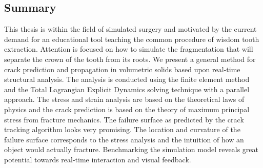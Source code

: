 
\begin{center}
\begin{minipage}{0.7\textwidth}
\chapter*{Summary}
This thesis is within the field of simulated surgery and motivated by
the current demand for an educational tool 
teaching the common procedure of wisdom tooth extraction.
Attention is focused on how to simulate the fragmentation 
that will separate the crown of the tooth from its roots.
%
We present a general method for crack prediction and propagation in
volumetric solids based upon
real-time structural analysis. The analysis is conducted using the
finite element method and the Total Lagrangian Explicit Dynamics
solving technique with a parallel approach.
%
The stress and strain analysis are based on 
the theoretical laws of physics and the crack prediction is based on
the theory of maximum principal stress from fracture
mechanics.
%
%
The failure surface as predicted by the
crack tracking algorithm looks very promising. The location and
curvature of the failure surface corresponds to the stress analysis
and the intuition of how an object would actually fracture.
%
Benchmarking the simulation model reveals great potential towards
real-time interaction and visual feedback.
\end{minipage}
\end{center}